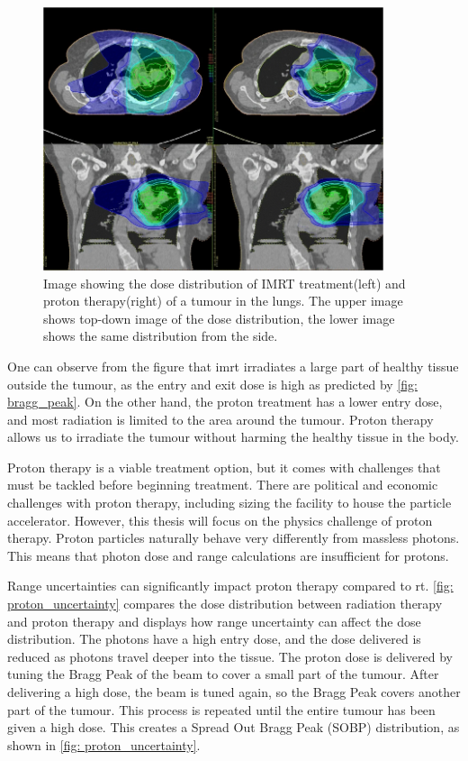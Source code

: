 \documentclass[main.tex]{subfiles}
\begin{document}
\begin{figure}[!ht]
    \centering
    \includegraphics[width=10cm ]{images/proton_vs_imrt.png}
    \caption{Image showing the dose distribution of IMRT treatment(left) and proton therapy(right) of a tumour in the lungs\cite{protonimage}. The upper image shows top-down image of the dose distribution, the lower image shows the same distribution from the side. }
    \label{fig: imrt_vs_photon}
\end{figure}


One can observe from the figure that \gls{imrt} irradiates a large part of healthy tissue outside the tumour, as the entry and exit dose is high as predicted by \autoref{fig: bragg_peak}. On the other hand, the proton treatment has a lower entry dose, and most radiation is limited to the area around the tumour. Proton therapy allows us to irradiate the tumour without harming the healthy tissue in the body.

Proton therapy is a viable treatment option, but it comes with challenges that must be tackled before beginning treatment. There are political and economic challenges with proton therapy, including sizing the facility to house the particle accelerator. However, this thesis will focus on the physics challenge of proton therapy. Proton particles naturally behave very differently from massless photons. This means that photon dose and range calculations are insufficient for protons.\cite{proton_challenges}

Range uncertainties can significantly impact proton therapy compared to \gls{rt}. \autoref{fig: proton_uncertainty} compares the dose distribution between radiation therapy and proton therapy and displays how range uncertainty can affect the dose distribution. The photons have a high entry dose, and the dose delivered is reduced as photons travel deeper into the tissue. The proton dose is delivered by tuning the Bragg Peak of the beam to cover a small part of the tumour. After delivering a high dose, the beam is tuned again, so the Bragg Peak covers another part of the tumour. This process is repeated until the entire tumour has been given a high dose. This creates a Spread Out Bragg Peak (SOBP) distribution, as shown in \autoref{fig: proton_uncertainty}.
\end{document}
